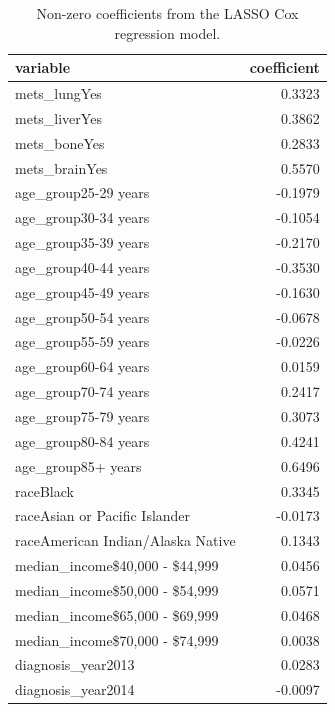 \documentclass[
  letterpaper,
  DIV=11,
  numbers=noendperiod]{scrartcl}
\begin{document}
\begin{longtable}[]{@{}lr@{}}

\caption{\label{tbl-lasso-vars}Non-zero coefficients from the LASSO Cox
regression model.}

\tabularnewline

\toprule\noalign{}
variable & coefficient \\
\midrule\noalign{}
\endhead
\bottomrule\noalign{}
\endlastfoot
mets\_lungYes & 0.3323 \\
mets\_liverYes & 0.3862 \\
mets\_boneYes & 0.2833 \\
mets\_brainYes & 0.5570 \\
age\_group25-29 years & -0.1979 \\
age\_group30-34 years & -0.1054 \\
age\_group35-39 years & -0.2170 \\
age\_group40-44 years & -0.3530 \\
age\_group45-49 years & -0.1630 \\
age\_group50-54 years & -0.0678 \\
age\_group55-59 years & -0.0226 \\
age\_group60-64 years & 0.0159 \\
age\_group70-74 years & 0.2417 \\
age\_group75-79 years & 0.3073 \\
age\_group80-84 years & 0.4241 \\
age\_group85+ years & 0.6496 \\
raceBlack & 0.3345 \\
raceAsian or Pacific Islander & -0.0173 \\
raceAmerican Indian/Alaska Native & 0.1343 \\
median\_income\$40,000 - \$44,999 & 0.0456 \\
median\_income\$50,000 - \$54,999 & 0.0571 \\
median\_income\$65,000 - \$69,999 & 0.0468 \\
median\_income\$70,000 - \$74,999 & 0.0038 \\
diagnosis\_year2013 & 0.0283 \\
diagnosis\_year2014 & -0.0097 \\

\end{longtable}

\newpage{}
\end{document}
